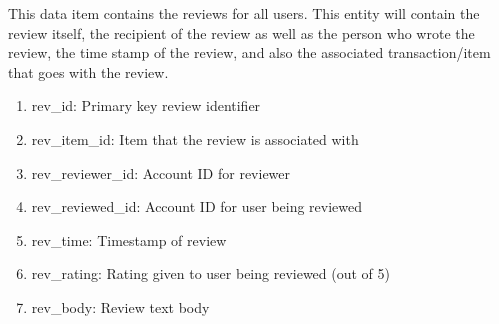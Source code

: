 \begin{description}[font=\bfseries\itshape]
\item[review:] This data item contains the reviews for all users.  This entity will contain the review itself, the recipient of the review as well as the person who wrote the review, the time stamp of the review, and also the associated transaction/item that goes with the review.
\begin{enumerate}
\item rev\_id: Primary key review identifier
\item rev\_item\_id: Item that the review is associated with
\item rev\_reviewer\_id: Account ID for reviewer
\item rev\_reviewed\_id: Account ID for user being reviewed
\item rev\_time: Timestamp of review
\item rev\_rating: Rating given to user being reviewed (out of 5)
\item rev\_body: Review text body
\end{enumerate}

\end{description}